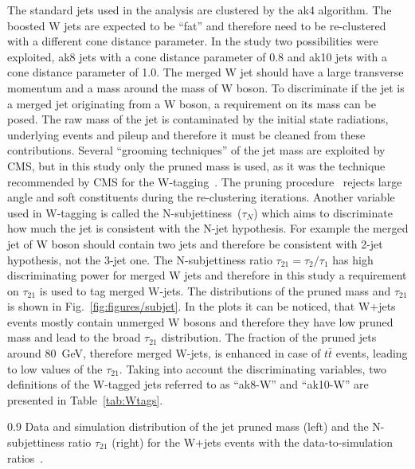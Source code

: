 The standard jets used in the analysis are clustered by the ak4 algorithm. The boosted W jets are expected to be ``fat'' and therefore need to be re-clustered with a different cone distance parameter. In the study two possibilities were exploited, ak8 jets with a cone distance parameter  of 0.8 and ak10 jets with a cone distance parameter of 1.0. The merged W jet should have a large transverse momentum and a mass around the mass of W boson. To discriminate if the jet is a merged jet originating from a W boson, a requirement on its mass can be posed. The raw mass of the jet is contaminated by the initial state radiations, underlying events and pileup and therefore it must be cleaned from these contributions. Several ``grooming techniques'' of the jet mass are exploited by CMS, but in this study only the pruned mass is used, as it was the technique recommended by CMS for the W-tagging~\cite{website:Wtagging}. The pruning procedure~\cite{Ellis:2009su} rejects large angle and soft constituents during the re-clustering iterations. Another variable used in W-tagging is called the N-subjettiness~($\tau_{N}$) which aims to discriminate how much the jet is consistent with the N-jet hypothesis. For example the merged jet of W boson should contain two jets and therefore be consistent with 2-jet hypothesis, not the 3-jet one. The N-subjettiness ratio $\tau_{21} = \tau_{2}/\tau_{1}$ has high discriminating power for merged W jets and therefore in this study a requirement on $\tau_{21}$ is used to tag merged W-jets. The distributions of the pruned mass and  $\tau_{21}$ is shown in Fig.~\ref{fig:figures/subjet}. In the plots it can be noticed, that  W+jets events mostly contain unmerged W bosons and therefore they have low pruned mass and lead to the broad $\tau_{21}$ distribution. The fraction of the pruned jets around 80~GeV, therefore merged W-jets, is enhanced in case of $t\bar{t}$ events, leading to low values of the $\tau_{21}$. Taking into account the discriminating variables, two definitions of the W-tagged jets referred to as ``ak8-W'' and ``ak10-W'' are presented in Table~\ref{tab:Wtags}.


                 {0.9}       %
                 {Data and simulation distribution of the jet pruned mass (left) and the N-subjettiness ratio $\tau_{21}$ (right) for the W+jets events with the data-to-simulation ratios~\cite{Khachatryan:2014vla}.}

